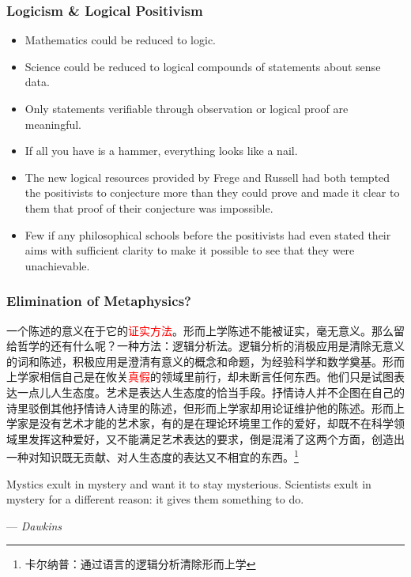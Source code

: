 \documentclass[UTF8,11pt,colorlinks,compress,openany]{beamer}%
\begin{document}
\begin{frame}\frametitle{Logicism \& Logical Positivism}
\begin{itemize}
	\item Mathematics could be reduced to logic.
	\item Science could be reduced to logical compounds of statements about sense data.
	\item Only statements verifiable through observation or logical proof are meaningful.
	\item If all you have is a hammer, everything looks like a nail.
	\item The new logical resources provided by Frege and Russell had both tempted the positivists to conjecture more than they could prove and made it clear to them that proof of their conjecture was impossible.
	\item Few if any philosophical schools before the positivists had even stated their aims with sufficient clarity to make it possible to see that they were unachievable.
\end{itemize}
\end{frame}

\begin{frame}\frametitle{Elimination of Metaphysics?}
\begin{block}{}\small
	一个陈述的意义在于它的\textcolor{red}{证实方法}。形而上学陈述不能被证实，毫无意义。那么留给哲学的还有什么呢？一种方法：逻辑分析法。逻辑分析的消极应用是清除无意义的词和陈述，积极应用是澄清有意义的概念和命题，为经验科学和数学奠基。形而上学家相信自己是在攸关\textcolor{red}{真假}的领域里前行，却未断言任何东西。他们只是试图表达一点儿人生态度。艺术是表达人生态度的恰当手段。抒情诗人并不企图在自己的诗里驳倒其他抒情诗人诗里的陈述，但形而上学家却用论证维护他的陈述。形而上学家是没有艺术才能的艺术家，有的是在理论环境里工作的爱好，却既不在科学领域里发挥这种爱好，又不能满足艺术表达的要求，倒是混淆了这两个方面，创造出一种对知识既无贡献、对人生态度的表达又不相宜的东西。\footnote{卡尔纳普：通过语言的逻辑分析清除形而上学}
\end{block}
	Mystics exult in mystery and want it to stay mysterious. Scientists exult in mystery for a different reason: it gives them something to do.\par \hfill --- \textsl{Dawkins}
\end{frame}

\end{document}
